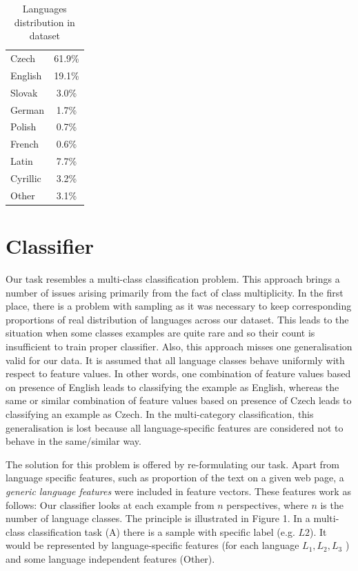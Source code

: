 \documentclass{acm_proc_article-sp}
\begin{document}
  \begin{table}[]
 \centering
 \caption{Languages distribution in dataset} 
 \label{langdist} 
 \vspace{0.5cm}
 \begin{tabular}{l||c}
    Czech & 61.9\% \\
    English & 19.1\% \\
    Slovak & 3.0\% \\
    German & 1.7\% \\
    Polish & 0.7\% \\
    French & 0.6\% \\ \hline
    Latin & 7.7\% \\
    Cyrillic & 3.2\% \\
    Other & 3.1\% \\
 \end{tabular}
 \end{table}


 \section{Classifier}
 \label{sec:classifier}

  Our task resembles a multi-class classification problem. 
  This approach brings a number of issues arising primarily from the fact of class multiplicity. 
  In the first place, there is a problem with sampling as it was necessary to keep corresponding proportions 
  of real distribution of languages across our dataset. 
  This leads to the situation when some classes examples are quite rare and so their count is insufficient 
  to train proper classifier. Also, this approach misses one generalisation valid for our data.
  It is assumed that all language classes behave uniformly with respect to feature values. In other words, 
  one combination of feature values based on presence of English leads to classifying the example as English, whereas 
  the same or similar combination of feature values based on presence of Czech leads to classifying an example as Czech.
  In the multi-category classification, this generalisation is lost because all language-specific features are considered
  not to behave in the same/similar way.

  The solution for this problem is offered by re-formulating our task.
  Apart from language specific features, such as proportion of the text on a given 
  web page, a \textit{generic language features} were included in feature vectors. These features work as follows:
  Our classifier looks at each example from $n$ perspectives, where $n$ is the number of language classes.
  The principle is illustrated in Figure 1. 
  In a multi-class classification task (A) there is a sample with specific label (e.g. $L2$).
  It would be represented by language-specific features (for each language $L_1,L_2,L_3$ ) and some 
  language independent features (Other).
\end{document}
